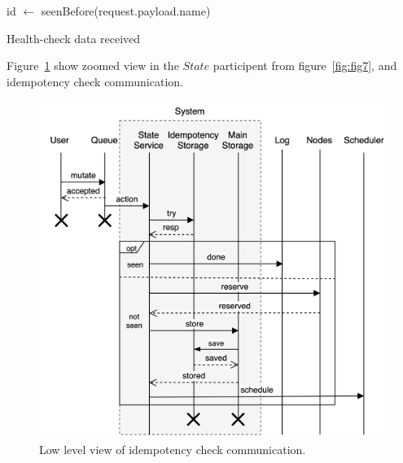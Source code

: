 \begin{algorithm}[H]
	\SetAlgoLined
	id $\leftarrow$ seenBefore(request.payload.name)\\
	\caption{Health-check data received}
	\label{alg:alg6}
\end{algorithm}

Figure~\ref{fig:fig13} show zoomed view in the $State$ participent from figure~\ref{fig:fig7}, and idempotency check communication.

\begin{figure}[!htpb]
	\begin{center}
		\includegraphics[scale=0.7]{images/Figure13}
	\end{center}
	\vspace{-0.7cm}
	\caption{Low level view of idempotency check communication.}
	\label{fig:fig13}
\end{figure}

